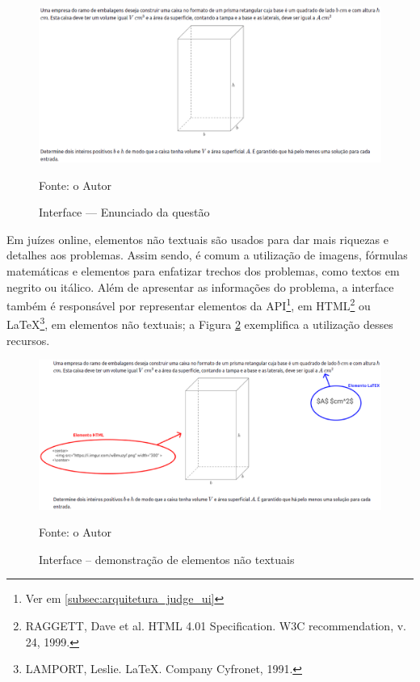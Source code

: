 \begin{figure}[H]
    \centering
    \caption{Interface — Enunciado da questão}
    \includegraphics[keepaspectratio=true,scale=0.35]{figuras/questionStatement2.eps}
    \label{fig:questionStatement2}
    
    \medskip
    Fonte: o Autor
    \medskip
\end{figure}

Em juízes online, elementos não textuais são usados para dar mais riquezas e detalhes aos problemas. Assim sendo, é comum a utilização de imagens, fórmulas matemáticas e elementos para enfatizar trechos dos problemas, como textos em negrito ou itálico. Além de apresentar as informações do problema, a interface também é responsável por representar elementos da API\footnote{Ver em \ref{subsec:arquitetura_judge_ui}}, em HTML\footnote{RAGGETT, Dave et al. HTML 4.01 Specification. W3C recommendation, v. 24, 1999.}  ou \LaTeX\footnote{LAMPORT, Leslie. LaTeX. Company Cyfronet, 1991.}, em elementos não textuais; a Figura \ref{fig:questionStatement} exemplifica a utilização desses recursos.

\begin{figure}
    \centering
    \caption{Interface -- demonstração de elementos não textuais}

    \includegraphics[keepaspectratio=true,scale=0.35]{figuras/questionStatement.eps}
    \label{fig:questionStatement}
    
    \medskip
    Fonte: o Autor
    \medskip
\end{figure}

